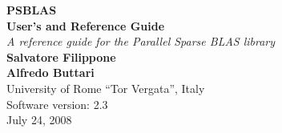 \documentclass[10pt,a4paper,twoside]{article}
\begin{document}
{\LARGE\bfseries PSBLAS\\[.8ex] User's and Reference
  Guide}\\[\baselineskip]
\emph{\large A reference guide for the Parallel Sparse BLAS library}\\[3ex]
{\bfseries Salvatore Filippone\\
   Alfredo Buttari } \\
 University of Rome ``Tor Vergata'', Italy\\[2ex]
Software version: 2.3\\
July 24, 2008
\cleardoublepage
\begingroup
  \renewcommand*{\thepage}{toc}
  \setcounter{page}{1}    %
  \tableofcontents
\endgroup  

\cleardoublepage

\setcounter{page}{1}    %












\cleardoublepage
\end{document}
